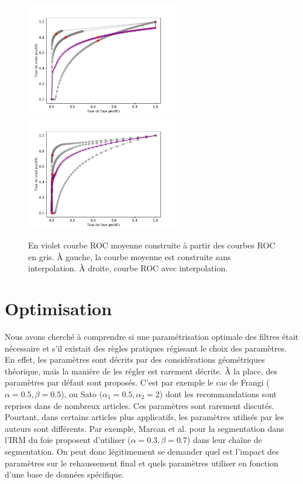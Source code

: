 \begin{figure}[ht]
  \centering
  \includegraphics[height=5cm]{Images/ROC_badMean.pdf}
  \includegraphics[height=5cm]{Images/ROC_goodMean.pdf}
  \caption{En violet courbe ROC moyenne construite à partir des courbes ROC en gris. À gauche, la courbe moyenne est construite sans interpolation. À droite, courbe ROC avec interpolation.}
  \label{fig:good_and_bad_roc}
\end{figure}

\section{Optimisation}

Nous avons cherché à comprendre si une paramétrisation optimale des filtres était nécessaire et s'il existait des règles pratiques régissant le choix des paramètres. En effet, les paramètres sont décrits par des considérations géométriques théorique, mais la manière de les régler est rarement décrite. À la place, des paramètres par défaut sont proposés. C'est par exemple le cas de Frangi ($\alpha=0.5,\beta=0.5$), ou Sato $(\alpha_1=0.5,\alpha_2=2$) dont les recommandations sont reprises dans de nombreux articles. Ces paramètres sont rarement discutés. Pourtant, dans certains articles plus applicatifs, les paramètres utilisés par les auteurs sont différents. Par exemple, Marcan et al. \cite{Marcan2014_vessel_seg} pour la segmentation dans l'IRM du foie proposent d'utiliser ($\alpha=0.3,\beta=0.7$) dans leur chaîne de segmentation. On peut donc légitimement se demander quel est l'impact des paramètres sur le rehaussement final et quels paramètres utiliser en fonction d'une base de données spécifique.


